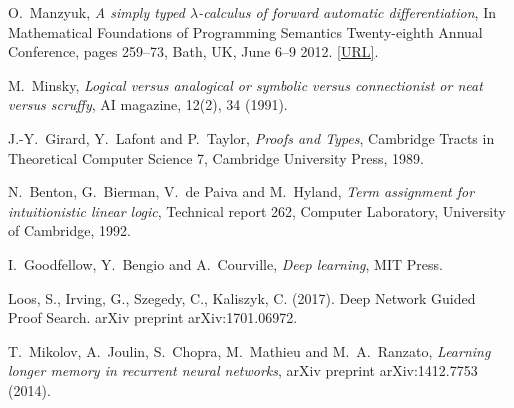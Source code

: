 \documentclass[english,letter paper,12pt,leqno]{article}
\theoremstyle{example}
\numberwithin{equation}{section}
\begin{document}
\begin{thebibliography}{BHLS03}
O.~Manzyuk, \textsl{A simply typed $\lambda$-calculus of forward automatic differentiation}, In Mathematical Foundations of Programming Semantics Twenty-eighth Annual Conference, pages 259--73, Bath, UK, June 6–9 2012. \href{http://dauns.math.tulane.edu/~mfps/mfps28proc.pdf}{[URL]}.

M.~Minsky, \textsl{Logical versus analogical or symbolic versus connectionist or neat versus scruffy}, AI magazine, 12(2), 34 (1991).

J.-Y.~Girard, Y.~Lafont and P.~Taylor, \textsl{Proofs and Types}, Cambridge Tracts in Theoretical Computer Science 7, Cambridge University Press, 1989.

N.~Benton, G.~Bierman, V.~de Paiva and M.~Hyland, \textsl{Term assignment for intuitionistic linear logic}, Technical report 262, Computer Laboratory, University of Cambridge, 1992.

I.~Goodfellow, Y.~Bengio and A.~Courville, \textsl{Deep learning}, MIT Press.

Loos, S., Irving, G., Szegedy, C., Kaliszyk, C. (2017). Deep Network Guided Proof Search. arXiv preprint arXiv:1701.06972.

T.~Mikolov, A.~Joulin, S.~Chopra, M.~Mathieu and M.~A.~Ranzato, \textsl{Learning longer memory in recurrent neural networks}, arXiv preprint arXiv:1412.7753 (2014). 

\end{thebibliography}
\end{document}
